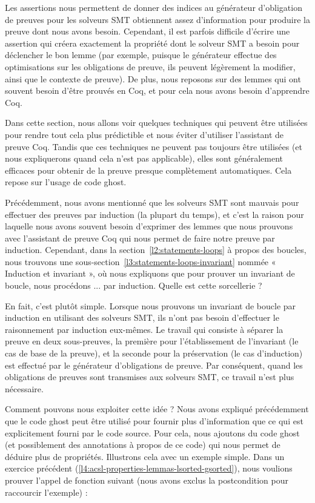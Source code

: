 Les assertions nous permettent de donner des indices au générateur
d'obligation de preuves pour les solveurs SMT obtiennent assez d'information
pour produire la preuve dont nous avons besoin. Cependant, il est parfois
difficile d'écrire une assertion qui créera exactement la propriété dont le
solveur SMT a besoin pour déclencher le bon lemme (par exemple, puisque le
générateur effectue des optimisations sur les obligations de preuve, ils peuvent
légèrement la modifier, ainsi que le contexte de preuve). De plus, nous
reposons sur des lemmes qui ont souvent besoin d'être prouvés en Coq, et pour
cela nous avons besoin d'apprendre Coq.


Dans cette section, nous allons voir quelques techniques qui peuvent être
utilisées pour rendre tout cela plus prédictible et nous éviter d'utiliser
l'assistant de preuve Coq. Tandis que ces techniques ne peuvent pas toujours
être utilisées (et nous expliquerons quand cela n'est pas applicable), elles
sont généralement efficaces pour obtenir de la preuve presque complètement
automatiques. Cela repose sur l'usage de code ghost.




Précédemment, nous avons mentionné que les solveurs SMT sont mauvais pour
effectuer des preuves par induction (la plupart du temps), et c'est la raison
pour laquelle nous avons souvent besoin d'exprimer des lemmes que nous prouvons
avec l'assistant de preuve Coq qui nous permet de faire notre preuve par
induction. Cependant, dans la section~\ref{l2:statements-loops} à propos des
boucles, nous trouvons une sous-section~\ref{l3:statements-loops-invariant}
nommée « Induction et invariant », où nous expliquons que pour prouver un
invariant de boucle, nous procédons ... par induction. Quelle est cette
sorcellerie ?


En fait, c'est plutôt simple. Lorsque nous prouvons un invariant de boucle par
induction en utilisant des solveurs SMT, ils n'ont pas besoin d'effectuer le
raisonnement par induction eux-mêmes. Le travail qui consiste à séparer la 
preuve en deux sous-preuves, la première pour l'établissement de l'invariant
(le cas de base de la preuve), et la seconde pour la préservation (le cas
d'induction) est effectué par le générateur d'obligations de preuve. 
Par conséquent, quand les obligations de preuves sont transmises aux solveurs
SMT, ce travail n'est plus nécessaire.


Comment pouvons nous exploiter cette idée ? Nous avons expliqué précédemment
que le code ghost peut être utilisé pour fournir plus d'information que ce qui
est explicitement fourni par le code source. Pour cela, nous ajoutons du code
ghost (et possiblement des annotations à propos de ce code) qui nous permet
de déduire plus de propriétés. Illustrons cela avec un exemple simple. Dans 
un exercice précédent (\ref{l4:acsl-properties-lemmas-lsorted-gsorted}), nous
voulions prouver l'appel de fonction suivant (nous avons exclus la
postcondition pour raccourcir l'exemple) :


